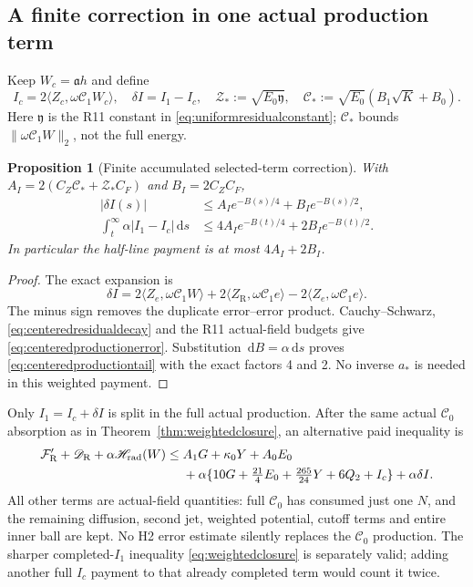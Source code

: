 \documentclass[11pt]{article}
\numberwithin{equation}{section}
\newtheorem{proposition}[theorem]{Proposition}
\newcommand{\dd}{\,\mathrm d}
\begin{document}
\subsection{A finite correction in one actual production term}

Keep $W_c=\mathfrak ah$ and define
\[
 I_c=2\langle Z_c,\omega\mathscr C_1W_c\rangle,
 \quad \delta I=I_1-I_c,\quad
 \mathcal Z_*:=\sqrt{E_0\mathfrak y},\quad
 \mathcal C_*:=\sqrt{E_0}(B_1\sqrt K+B_0).
\]
Here $\mathfrak y$ is the R11 constant in
\eqref{eq:uniformresidualconstant}; $\mathcal C_*$ bounds
$\|\omega\mathscr C_1W\|_2$, not the full energy.

\begin{proposition}[Finite accumulated selected-term correction]
\label{prop:finiteproductioncorrection}
With $A_I=2(C_Z\mathcal C_*+\mathcal Z_*C_F)$ and $B_I=2C_ZC_F$,
\begin{align}
 |\delta I(s)|&\le A_Ie^{-B(s)/4}+B_Ie^{-B(s)/2},
 \label{eq:centeredproductionerror}\\
 \int_t^\infty\alpha|I_1-I_c|\dd s
 &\le4A_Ie^{-B(t)/4}+2B_Ie^{-B(t)/2}.
 \label{eq:centeredproductiontail}
\end{align}
In particular the half-line payment is at most $4A_I+2B_I$.
\end{proposition}
\begin{proof}
The exact expansion is
\begin{equation}\label{eq:centeredproductionidentity}
 \delta I=2\langle Z_e,\omega\mathscr C_1W\rangle
       +2\langle Z_{\mathrm R},\omega\mathscr C_1e\rangle
       -2\langle Z_e,\omega\mathscr C_1e\rangle.
\end{equation}
The minus sign removes the duplicate error--error product.
Cauchy--Schwarz, \eqref{eq:centeredresidualdecay} and the R11 actual-field
budgets give \eqref{eq:centeredproductionerror}.
Substitution $\dd B=\alpha\dd s$ proves
\eqref{eq:centeredproductiontail} with the exact factors 4 and 2.
No inverse $a_*$ is needed in this weighted payment.
\end{proof}

Only $I_1=I_c+\delta I$ is split in the full actual production.
After the same actual $\mathscr C_0$ absorption as in
Theorem~\ref{thm:weightedclosure}, an alternative paid inequality is
\begin{equation}\label{eq:actualcarrierproduction}
 \begin{split}
 \mathcal F_{\mathrm R}'+\mathscr D_{\mathrm R}
       +\alpha\mathscr H_{\rm rad}(W)
 \le{}&A_1G+\kappa_0Y+A_0E_0\\
 &+\alpha\{10G+\tfrac{21}{4}E_0
                  +\tfrac{265}{24}Y+6Q_2+I_c\}
       +\alpha\delta I.
 \end{split}
\end{equation}
All other terms are actual-field quantities: full $\mathscr C_0$ has
consumed just one $N$, and the remaining diffusion, second jet, weighted
potential, cutoff terms and entire inner ball are kept. No H2 error
estimate silently replaces the $\mathscr C_0$ production.
The sharper completed-$I_1$ inequality \eqref{eq:weightedclosure} is
separately valid; adding another full $I_c$ payment to that already
completed term would count it twice.
\end{document}
